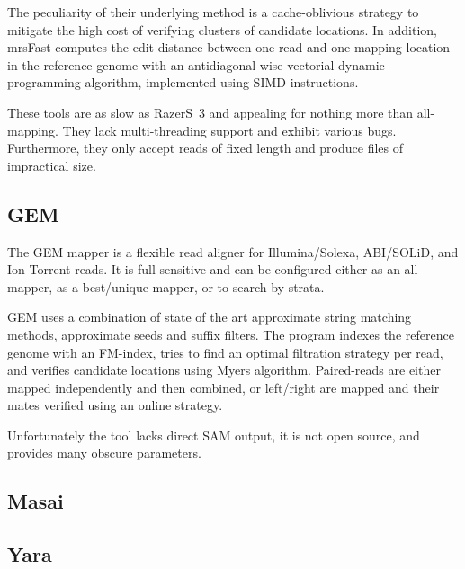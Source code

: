 The peculiarity of their underlying method is a cache-oblivious strategy to mitigate the high cost of verifying clusters of candidate locations.
In addition, mrsFast computes the edit distance between one read and one mapping location in the reference genome with an antidiagonal-wise vectorial dynamic programming algorithm, implemented using SIMD instructions.

These tools are as slow as RazerS~3 and appealing for nothing more than all-mapping.
They lack multi-threading support and exhibit various bugs.
Furthermore, they only accept reads of fixed length and produce files of impractical size.


\subsection{GEM}

The GEM mapper \citep{Gem} is a flexible read aligner for Illumina/Solexa, ABI/SOLiD, and Ion Torrent reads.
It is full-sensitive and can be configured either as an all-mapper, as a best/unique-mapper, or to search by strata.

GEM uses a combination of state of the art approximate string matching methods, \eg approximate seeds and suffix filters.
The program indexes the reference genome with an FM-index, tries to find an optimal filtration strategy per read, and verifies candidate locations using Myers algorithm.
Paired-reads are either mapped independently and then combined, or left/right are mapped and their mates verified using an online strategy.

Unfortunately the tool lacks direct SAM output, it is not open source, and provides many obscure parameters.


\subsection{Masai}


\subsection{Yara}


